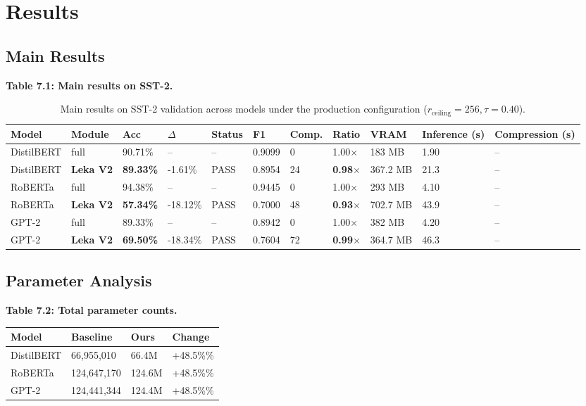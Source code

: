 \section{Results}

\subsection{Main Results}

\textbf{Table 7.1: Main results on SST-2.}

\begin{table}[t]
\centering
\small
\begin{tabular}{lllllllllll}
\toprule
\textbf{Model} & \textbf{Module} & \textbf{Acc} & \textbf{$\Delta$} & \textbf{Status} & \textbf{F1} & \textbf{Comp.} & \textbf{Ratio} & \textbf{VRAM} & \textbf{Inference (s)} & \textbf{Compression (s)} \\
\midrule
DistilBERT & full & 90.71\% & -- & -- & 0.9099 & 0 & 1.00$\times$ & 183 MB & 1.90 & -- \\
DistilBERT & \textbf{Leka V2} & \textbf{89.33\%} & -1.61\% & PASS & 0.8954 & 24 & \textbf{0.98$\times$} & 367.2 MB & 21.3 & -- \\
RoBERTa & full & 94.38\% & -- & -- & 0.9445 & 0 & 1.00$\times$ & 293 MB & 4.10 & -- \\
RoBERTa & \textbf{Leka V2} & \textbf{57.34\%} & -18.12\% & PASS & 0.7000 & 48 & \textbf{0.93$\times$} & 702.7 MB & 43.9 & -- \\
GPT-2 & full & 89.33\% & -- & -- & 0.8942 & 0 & 1.00$\times$ & 382 MB & 4.20 & -- \\
GPT-2 & \textbf{Leka V2} & \textbf{69.50\%} & -18.34\% & PASS & 0.7604 & 72 & \textbf{0.99$\times$} & 364.7 MB & 46.3 & -- \\
\bottomrule
\end{tabular}
\caption{Main results on SST-2 validation across models under the production configuration ($r_{\mathrm{ceiling}}=256, \tau=0.40$).}
\label{tab:main_sst2}
\end{table}

\subsection{Parameter Analysis}

\textbf{Table 7.2: Total parameter counts.}

\begin{table}[H]
\centering
\small
\begin{tabular}{llll}
\toprule
\textbf{Model} & \textbf{Baseline} & \textbf{Ours} & \textbf{Change} \\
\midrule
DistilBERT & 66,955,010 & 66.4M & +48.5\%\% \\
RoBERTa & 124,647,170 & 124.6M & +48.5\%\% \\
GPT-2 & 124,441,344 & 124.4M & +48.5\%\% \\
\bottomrule
\end{tabular}
\end{table}

